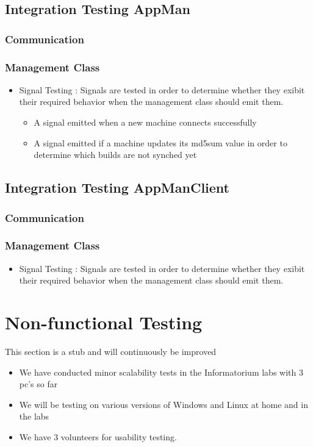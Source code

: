 \documentclass[a4paper,12pt,final]{article}
\begin{document}
\subsection{Integration Testing AppMan}
\subsubsection{Communication}

\subsubsection{Management Class}
\begin{itemize}
\item Signal Testing : Signals are tested in order to determine whether they exibit their required behavior when the management class should emit them.
\begin{itemize}
\item A signal emitted when a new machine connects successfully
\item A signal emitted if a machine updates its md5sum value in order to determine which builds are not synched yet
\end{itemize}
\end{itemize}







\subsection{Integration Testing AppManClient}

\subsubsection{Communication}

\subsubsection{Management Class}
\begin{itemize}
\item Signal Testing : Signals are tested in order to determine whether they exibit their required behavior when the management class should emit them.
\end{itemize}

\newpage
\section{Non-functional Testing}
This section is a stub and will continuously be improved
\begin{itemize}
\item We have conducted minor scalability tests in the Informatorium labs with 3 pc's so far
\item We will be testing on various versions of Windows and Linux at home and in the labs
\item We have 3 volunteers for usability testing.
\end{itemize}
\end{document}
